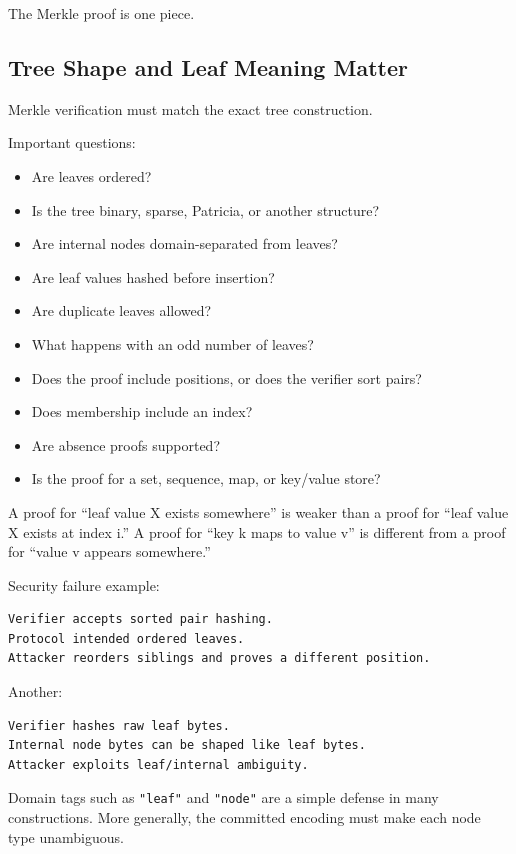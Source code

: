 The Merkle proof is one piece.

\subsection{Tree Shape and Leaf Meaning Matter}

Merkle verification must match the exact tree construction.

Important questions:

\begin{itemize}
\tightlist
\item
  Are leaves ordered?
\item
  Is the tree binary, sparse, Patricia, or another structure?
\item
  Are internal nodes domain-separated from leaves?
\item
  Are leaf values hashed before insertion?
\item
  Are duplicate leaves allowed?
\item
  What happens with an odd number of leaves?
\item
  Does the proof include positions, or does the verifier sort pairs?
\item
  Does membership include an index?
\item
  Are absence proofs supported?
\item
  Is the proof for a set, sequence, map, or key/value store?
\end{itemize}

A proof for ``leaf value X exists somewhere'' is weaker than a proof for
``leaf value X exists at index i.'' A proof for ``key k maps to value
v'' is different from a proof for ``value v appears somewhere.''

Security failure example:

\begin{lstlisting}
Verifier accepts sorted pair hashing.
Protocol intended ordered leaves.
Attacker reorders siblings and proves a different position.
\end{lstlisting}

Another:

\begin{lstlisting}
Verifier hashes raw leaf bytes.
Internal node bytes can be shaped like leaf bytes.
Attacker exploits leaf/internal ambiguity.
\end{lstlisting}

Domain tags such as \passthrough{\lstinline!"leaf"!} and
\passthrough{\lstinline!"node"!} are a simple defense in many
constructions. More generally, the committed encoding must make each
node type unambiguous.

